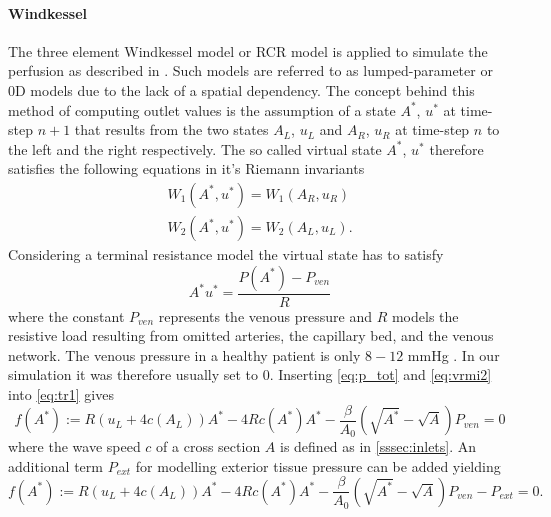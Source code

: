 \documentclass[a4paper, oneside]{discothesis}
\begin{document}
	\paragraph{Windkessel} \label{par:wk}
	The three element Windkessel model or RCR model is applied to simulate the perfusion as described in \cite{CiCP-4-317}.
	Such models are referred to as lumped-parameter or 0D models due to the lack of a spatial dependency.
	The concept behind this method of computing outlet values is the assumption of a state $A^*$, $u^*$ at time-step $n+1$ that results from the two states $A_L$, $u_L$ and $A_R$, $u_R$ at time-step $n$ to the left and the right respectively.
	The so called virtual state $A^*$, $u^*$ therefore satisfies the following equations in it's Riemann invariants
	\begin{align}
		W_1(A^*,u^*) = W_1(A_R,u_R) \label{eq:vrmi1}\\
		W_2(A^*,u^*) = W_2(A_L,u_L). \label{eq:vrmi2}
	\end{align}
	Considering a terminal resistance model the virtual state has to satisfy
	\begin{equation}
		A^*u^* = \frac{P(A^*) - P_{ven}}{R} \label{eq:tr1}
	\end{equation}
	where the constant $P_{ven}$ represents the venous pressure and $R$ models the resistive load resulting from omitted arteries, the capillary bed, and the venous network.
	The venous pressure in a healthy patient is only $8-12$ mmHg \cite{klingensmith2008washington}.
	In our simulation it was therefore usually set to $0$.
	Inserting \autoref{eq:p_tot} and \autoref{eq:vrmi2} into \autoref{eq:tr1} gives
	\begin{equation}
		f(A^*) := R \left(u_L + 4c(A_L) \right) A^* - 4Rc(A^*)A^* - \frac{\beta}{A_0} \left( \sqrt{A^*} - \sqrt{A} \right) P_{ven} = 0\label{eq:tr2}
	\end{equation}
	where the wave speed $c$ of a cross section $A$ is defined as in \autoref{sssec:inlets}.
	An additional term $P_{ext}$ for modelling exterior tissue pressure can be added yielding
	\begin{equation}
		f(A^*) := R \left(u_L + 4c(A_L) \right) A^* - 4Rc(A^*)A^* - \frac{\beta}{A_0} \left( \sqrt{A^*} - \sqrt{A} \right) P_{ven} - P_{ext} = 0.\label{eq:tr3}
	\end{equation}
\end{document}
